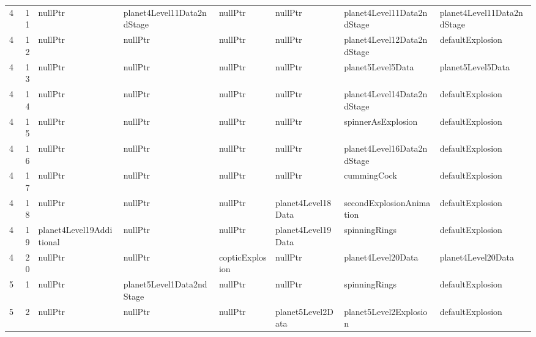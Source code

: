 \begin{tabular}{rrllllll}
      4 &      11 & nullPtr                  & planet4Level11Data2ndStage   & nullPtr                      & nullPtr                   & planet4Level11Data2ndStage & planet4Level11Data2ndStage \\
      4 &      12 & nullPtr                  & nullPtr                      & nullPtr                      & nullPtr                   & planet4Level12Data2ndStage & defaultExplosion           \\
      4 &      13 & nullPtr                  & nullPtr                      & nullPtr                      & nullPtr                   & planet5Level5Data          & planet5Level5Data          \\
      4 &      14 & nullPtr                  & nullPtr                      & nullPtr                      & nullPtr                   & planet4Level14Data2ndStage & defaultExplosion           \\
      4 &      15 & nullPtr                  & nullPtr                      & nullPtr                      & nullPtr                   & spinnerAsExplosion         & defaultExplosion           \\
      4 &      16 & nullPtr                  & nullPtr                      & nullPtr                      & nullPtr                   & planet4Level16Data2ndStage & defaultExplosion           \\
      4 &      17 & nullPtr                  & nullPtr                      & nullPtr                      & nullPtr                   & cummingCock                & defaultExplosion           \\
      4 &      18 & nullPtr                  & nullPtr                      & nullPtr                      & planet4Level18Data        & secondExplosionAnimation   & defaultExplosion           \\
      4 &      19 & planet4Level19Additional & nullPtr                      & nullPtr                      & planet4Level19Data        & spinningRings              & defaultExplosion           \\
      4 &      20 & nullPtr                  & nullPtr                      & copticExplosion              & nullPtr                   & planet4Level20Data         & planet4Level20Data         \\
      5 &       1 & nullPtr                  & planet5Level1Data2ndStage    & nullPtr                      & nullPtr                   & spinningRings              & defaultExplosion           \\
      5 &       2 & nullPtr                  & nullPtr                      & nullPtr                      & planet5Level2Data         & planet5Level2Explosion     & defaultExplosion           \\

\end{tabular}
